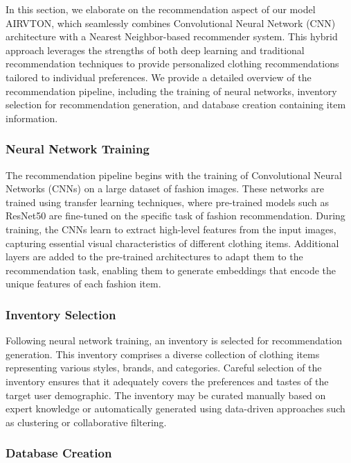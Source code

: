         In this section, we elaborate on the recommendation aspect of our model AIRVTON, which seamlessly combines Convolutional Neural Network (CNN) architecture with a Nearest Neighbor-based recommender system. This hybrid approach leverages the strengths of both deep learning and traditional recommendation techniques to provide personalized clothing recommendations tailored to individual preferences. We provide a detailed overview of the recommendation pipeline, including the training of neural networks, inventory selection for recommendation generation, and database creation containing item information.

        \subsubsection{Neural Network Training}

        The recommendation pipeline begins with the training of Convolutional Neural Networks (CNNs) on a large dataset of fashion images. These networks are trained using transfer learning techniques, where pre-trained models such as ResNet50 are fine-tuned on the specific task of fashion recommendation. During training, the CNNs learn to extract high-level features from the input images, capturing essential visual characteristics of different clothing items. Additional layers are added to the pre-trained architectures to adapt them to the recommendation task, enabling them to generate embeddings that encode the unique features of each fashion item.

        \subsubsection{Inventory Selection}

        Following neural network training, an inventory is selected for recommendation generation. This inventory comprises a diverse collection of clothing items representing various styles, brands, and categories. Careful selection of the inventory ensures that it adequately covers the preferences and tastes of the target user demographic. The inventory may be curated manually based on expert knowledge or automatically generated using data-driven approaches such as clustering or collaborative filtering.

        \subsubsection{Database Creation}

